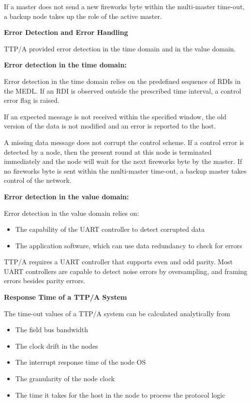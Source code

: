 If a master does not send a new fireworks byte within the multi-master
time-out, a backup node takes up the role of the active master.

\textbf{Error Detection and Error Handling}

TTP/A provided error detection in the time domain and in the value
domain.

\textbf{Error detection in the time domain:}

Error detection in the time domain relies on the predefined sequence of
RDIs in the MEDL. If an RDI is observed outside the prescribed time
interval, a control error flag is raised.

If an expected message is not received within the specified window, the
old version of the data is not modified and an error is reported to the
host.

A missing data message does not corrupt the control scheme. If a control
error is detected by a node, then the present round at this node is
terminated immediately and the node will wait for the next fireworks
byte by the master. If no fireworks byte is sent within the multi-master
time-out, a backup master takes control of the network.

\textbf{Error detection in the value domain:}

Error detection in the value domain relies on:

\begin{itemize}
\item
  The capability of the UART controller to detect corrupted data
\item
  The application software, which can use data redundancy to check for
  errors
\end{itemize}

TTP/A requires a UART controller that supports even and odd parity. Most
UART controllers are capable to detect noise errors by oversampling, and
framing errors besides parity errors.

\textbf{Response Time of a TTP/A System}

The time-out values of a TTP/A system can be calculated analytically
from

\begin{itemize}
\item
  The field bus bandwidth
\item
  The clock drift in the nodes
\item
  The interrupt response time of the node OS
\item
  The granularity of the node clock
\item
  The time it takes for the host in the node to process the protocol
  logic
\end{itemize}

